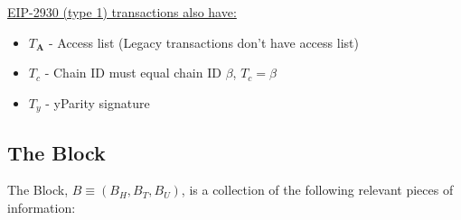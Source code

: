 \documentclass{article}
\begin{document}
\begin{itemize}
\begin{itemize}
    \end{itemize}
    
    \underline{EIP-2930 (type 1) transactions also have:}
    \begin{itemize}
        \item $T\bm{_A}$ - Access list (Legacy transactions don't have access list)
         \item $T_c$ - Chain ID must equal chain ID $\beta$, $T_c = \beta$
        \item $T_y$ - yParity signature 
    \end{itemize}
    
    
\end{itemize}

\subsection{The Block}

The Block, $B \equiv (B_H, B_T, B_U)$, is a collection of the following relevant pieces  of information: 
\end{document}
